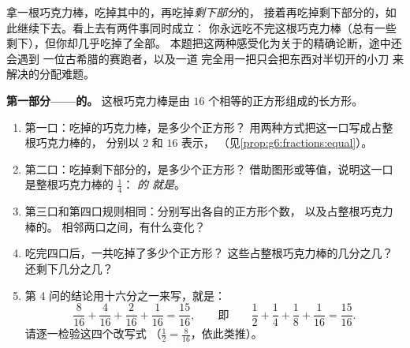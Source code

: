 \begin{problem}
\label{pb:g6:fractions:1}
拿一根巧克力棒，吃掉其中的，再吃掉\emph{剩下部分}的，
接着再吃掉剩下部分的，如此继续下去。看上去有两件事同时成立：
你永远吃不完这根巧克力棒（总有一些剩下），但你却几乎吃掉了全部。
本题把这两种感受化为关于的精确论断，途中还会遇到
一位古希腊的赛跑者，以及一道
完全用一把只会把东西对半切开的小刀
来解决的分配难题。

\medskip
\noindent\textbf{第一部分——的。}
这根巧克力棒是由 $16$ 个相等的正方形组成的长方形。
\begin{enumerate}
  \item 第一口：吃掉的巧克力棒，是多少个正方形？
        用两种方式把这一口写成占整根巧克力棒的，
        分别以 $2$ 和 $16$ 表示，
        （见\cref{prop:g6:fractions:equal}）。
  \item 第二口：吃掉剩下部分的，是多少个正方形？
        借助图形或等值，说明这一口是整根巧克力棒的 $\frac14$：
        \emph{的
        就是}。
  \item 第三口和第四口规则相同：分别写出各自的正方形个数，
        以及占整根巧克力棒的。
        相邻两口之间，有什么变化？
  \item 吃完四口后，一共吃掉了多少个正方形？
        这些占整根巧克力棒的几分之几？
        还剩下几分之几？
  \item 第 4 问的结论用十六分之一来写，就是：
        \[
        \frac{8}{16} + \frac{4}{16} + \frac{2}{16} + \frac{1}{16}
        = \frac{15}{16},
        \qquad\text{即}\qquad
        \frac12 + \frac14 + \frac18 + \frac{1}{16}
        = \frac{15}{16} .
        \]
        请逐一检验这四个改写式
        （$\frac12 = \frac{8}{16}$，依此类推）。
\end{enumerate}


\end{problem}
